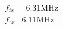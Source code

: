 \documentclass[preview]{standalone}
\begin{document}
\begin{center}
$f_{tx}=$6.31MHz\\$f_{rx}$=6.11MHz
\end{center}
\end{document}
